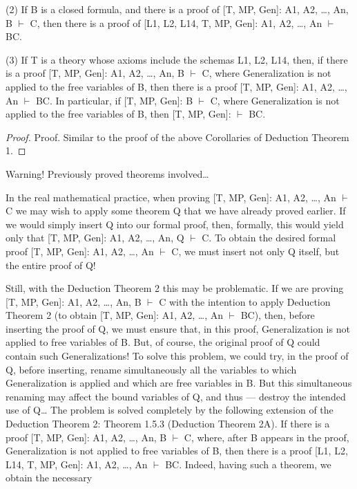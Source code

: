 \begin{corollary}

(2) If B is a closed formula, and there is a proof of [T, MP, Gen]: A1, A2, \ldots , An, B \(\vdash\) C, then there is a
proof of [L1, L2, L14, T, MP, Gen]: A1, A2, \ldots , An \(\vdash\) B\IMPLIES C.
\end{corollary}

\begin{corollary}
(3) If T is a theory whose axioms include the schemas L1, L2, L14, then, if there is a proof [T, MP, Gen]:
A1, A2, \ldots , An, B \(\vdash\) C, where Generalization is not applied to the free variables of B, then there is a proof
[T, MP, Gen]: A1, A2, \ldots , An \(\vdash\) B\IMPLIES C. In particular, if [T, MP, Gen]: B \(\vdash\) C, where Generalization is not
applied to the free variables of B, then [T, MP, Gen]: \(\vdash\) B\IMPLIES C.
\end{corollary}

\begin{proof}
Proof. Similar to the proof of the above Corollaries of Deduction Theorem 1.
\end{proof}

Warning! Previously proved theorems involved\ldots 

In the real mathematical practice, when proving [T, MP, Gen]: A1, A2, \ldots , An \(\vdash\) C we may wish to apply some theorem Q that we have already proved earlier. If we would simply insert Q into our formal proof, then, formally, this would yield only that [T, MP, Gen]: A1, A2, \ldots , An, Q \(\vdash\) C. To obtain the desired formal proof [T, MP, Gen]: A1, A2, \ldots , An \(\vdash\) C, we must insert not only Q itself, but the entire proof of Q!

Still, with the Deduction Theorem 2 this may be problematic. If we are proving [T, MP, Gen]: A1, A2, \ldots ,
An, B \(\vdash\) C with the intention to apply Deduction Theorem 2 (to obtain [T, MP, Gen]: A1, A2, \ldots , An \(\vdash\)
B\IMPLIES C), then, before inserting the proof of Q, we must ensure that, in this proof, Generalization is not
applied to free variables of B. But, of course, the original proof of Q could contain such Generalizations!
To solve this problem, we could try, in the proof of Q, before inserting, rename simultaneously all the
variables to which Generalization is applied and which are free variables in B. But this simultaneous
renaming may affect the bound variables of Q, and thus --- destroy the intended use of Q\ldots 
The problem is solved completely by the following extension of the Deduction Theorem 2:
Theorem 1.5.3 (Deduction Theorem 2A). If there is a proof [T, MP, Gen]: A1, A2, \ldots , An, B \(\vdash\) C, where,
after B appears in the proof, Generalization is not applied to free variables of B, then there is a proof
[L1, L2, L14, T, MP, Gen]: A1, A2, \ldots , An \(\vdash\) B\IMPLIES C.
Indeed, having such a theorem, we obtain the necessary

